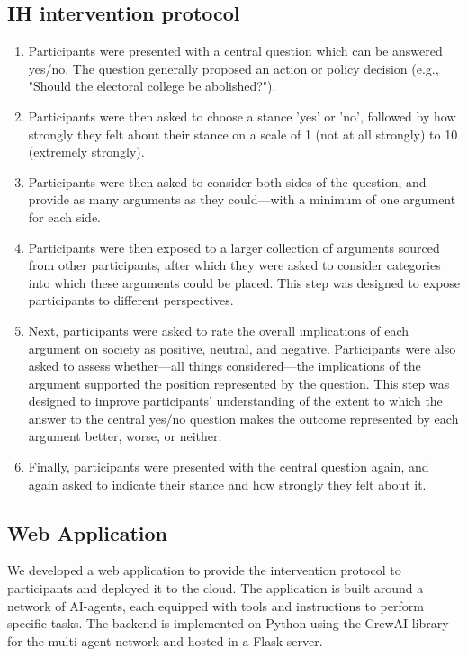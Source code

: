 \documentclass{scrartcl}
\begin{document}
\subsection{IH intervention protocol}
\label{section:ih-intervention-protocol}
\begin{enumerate}
    \item Participants were presented with a central question which can be answered yes/no. The question generally proposed an action or policy decision (e.g., "Should the electoral college be abolished?").
    \item Participants were then asked to choose a stance 'yes' or 'no', followed by how strongly they felt about their stance on a scale of 1 (not at all strongly) to 10 (extremely strongly).
    \item Participants were then asked to consider both sides of the question, and provide as many arguments as they could---with a minimum of one argument for each side.
    \item Participants were then exposed to a larger collection of arguments sourced from other participants, after which they were asked to consider categories into which these arguments could be placed. This step was designed to expose participants to different perspectives.
    \item Next, participants were asked to rate the overall implications of each argument on society as positive, neutral, and negative. Participants were also asked to assess whether---all things considered---the implications of the argument supported the position represented by the question. This step was designed to improve participants' understanding of the extent to which the answer to the central yes/no question makes the outcome represented by each argument better, worse, or neither.
    \item Finally, participants were presented with the central question again, and again asked to indicate their stance and how strongly they felt about it.
\end{enumerate}
\subsection{Web Application}
\label{section:web-application}
We developed a web application to provide the intervention protocol to participants and deployed it to the cloud. The application is built around a network of AI-agents, each equipped with tools and instructions to perform specific tasks. The backend is implemented on Python using the CrewAI library for the multi-agent network and hosted in a Flask server.
\end{document}
